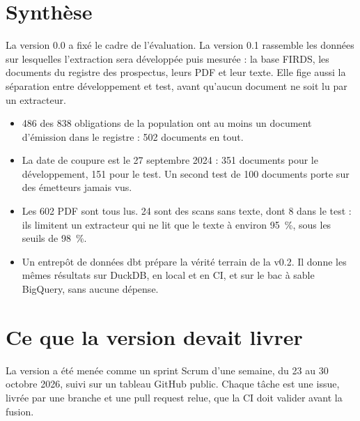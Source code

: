 \documentclass[11pt,a4paper]{article}
\begin{document}

\setcounter{tocdepth}{1}
\tableofcontents
\newpage

\section*{Synthèse}

La version 0.0 a fixé le cadre de l'évaluation. La version 0.1 rassemble les données sur lesquelles l'extraction sera développée puis mesurée : la base FIRDS, les documents du registre des prospectus, leurs PDF et leur texte. Elle fige aussi la séparation entre développement et test, avant qu'aucun document ne soit lu par un extracteur.

\begin{itemize}
  \item 486 des 838 obligations de la population ont au moins un document d'émission dans le registre : 502 documents en tout.
  \item La date de coupure est le 27 septembre 2024 : 351 documents pour le développement, 151 pour le test. Un second test de 100 documents porte sur des émetteurs jamais vus.
  \item Les 602 PDF sont tous lus. 24 sont des scans sans texte, dont 8 dans le test : ils limitent un extracteur qui ne lit que le texte à environ 95~\%, sous les seuils de 98~\%.
  \item Un entrepôt de données dbt prépare la vérité terrain de la v0.2. Il donne les mêmes résultats sur DuckDB, en local et en CI, et sur le bac à sable BigQuery, sans aucune dépense.
\end{itemize}

\section{Ce que la version devait livrer}

La version a été menée comme un sprint Scrum d'une semaine, du 23 au 30 octobre 2026, suivi sur un tableau GitHub public. Chaque tâche est une issue, livrée par une branche et une pull request relue, que la CI doit valider avant la fusion.
\end{document}
